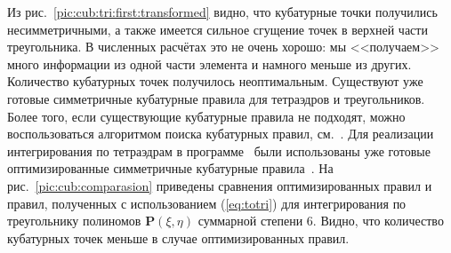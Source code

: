Из рис.~\ref{pic:cub:tri:first:transformed} видно, что кубатурные точки получились несимметричными, а также имеется сильное сгущение точек в верхней части треугольника. В численных расчётах это не очень хорошо: мы <<получаем>> много информации из одной части элемента и намного меньше из других. Количество кубатурных точек получилось неоптимальным. Существуют уже готовые симметричные кубатурные правила для тетраэдров и треугольников. Более того, если существующие кубатурные правила не подходят, можно воспользоваться алгоритмом поиска кубатурных правил, см.~\cite{SukumarCubatureRules:2020:en}. Для реализации интегрирования по тетраэдрам в программе~\cite{VolkovA:2010:ru} были использованы уже готовые оптимизированные симметричные кубатурные правила~\cite{CubatureRules}. На рис.~\ref{pic:cub:comparasion} приведены сравнения оптимизированных правил и правил, полученных с использованием (\ref{eq:totri}) для интегрирования по треугольнику полиномов \(\mathbf P (\xi, \eta)\) суммарной степени 6. Видно, что количество кубатурных точек меньше в случае оптимизированных правил.